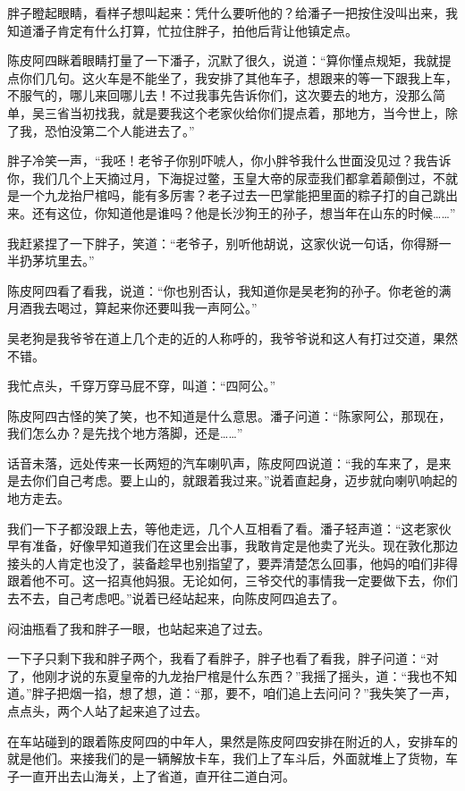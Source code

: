胖子瞪起眼睛，看样子想叫起来：凭什么要听他的？给潘子一把按住没叫出来，我知道潘子肯定有什么打算，忙拉住胖子，拍他后背让他镇定点。

陈皮阿四眯着眼睛打量了一下潘子，沉默了很久，说道：“算你懂点规矩，我就提点你们几句。这火车是不能坐了，我安排了其他车子，想跟来的等一下跟我上车，不服气的，哪儿来回哪儿去！不过我事先告诉你们，这次要去的地方，没那么简单，吴三省当初找我，就是要我这个老家伙给你们提点着，那地方，当今世上，除了我，恐怕没第二个人能进去了。”

胖子冷笑一声，“我呸！老爷子你别吓唬人，你小胖爷我什么世面没见过？我告诉你，我们几个上天摘过月，下海捉过鳖，玉皇大帝的尿壶我们都拿着颠倒过，不就是一个九龙抬尸棺吗，能有多厉害？老子过去一巴掌能把里面的粽子打的自己跳出来。还有这位，你知道他是谁吗？他是长沙狗王的孙子，想当年在山东的时候……”

我赶紧捏了一下胖子，笑道：“老爷子，别听他胡说，这家伙说一句话，你得掰一半扔茅坑里去。”

陈皮阿四看了看我，说道：“你也别否认，我知道你是吴老狗的孙子。你老爸的满月酒我去喝过，算起来你还要叫我一声阿公。”

吴老狗是我爷爷在道上几个走的近的人称呼的，我爷爷说和这人有打过交道，果然不错。

我忙点头，千穿万穿马屁不穿，叫道：“四阿公。”

陈皮阿四古怪的笑了笑，也不知道是什么意思。潘子问道：“陈家阿公，那现在，我们怎么办？是先找个地方落脚，还是……”

话音未落，远处传来一长两短的汽车喇叭声，陈皮阿四说道：“我的车来了，是来是去你们自己考虑。要上山的，就跟着我过来。”说着直起身，迈步就向喇叭响起的地方走去。

我们一下子都没跟上去，等他走远，几个人互相看了看。潘子轻声道：“这老家伙早有准备，好像早知道我们在这里会出事，我敢肯定是他卖了光头。现在敦化那边接头的人肯定也没了，装备趁早也别指望了，要弄清楚怎么回事，他妈的咱们非得跟着他不可。这一招真他妈狠。无论如何，三爷交代的事情我一定要做下去，你们去不去，自己考虑吧。”说着已经站起来，向陈皮阿四追去了。

闷油瓶看了我和胖子一眼，也站起来追了过去。

一下子只剩下我和胖子两个，我看了看胖子，胖子也看了看我，胖子问道：“对了，他刚才说的东夏皇帝的九龙抬尸棺是什么东西？”我摇了摇头，道：“我也不知道。”胖子把烟一掐，想了想，道：“那，要不，咱们追上去问问？”我失笑了一声，点点头，两个人站了起来追了过去。

在车站碰到的跟着陈皮阿四的中年人，果然是陈皮阿四安排在附近的人，安排车的就是他们。来接我们的是一辆解放卡车，我们上了车斗后，外面就堆上了货物，车子一直开出去山海关，上了省道，直开往二道白河。

